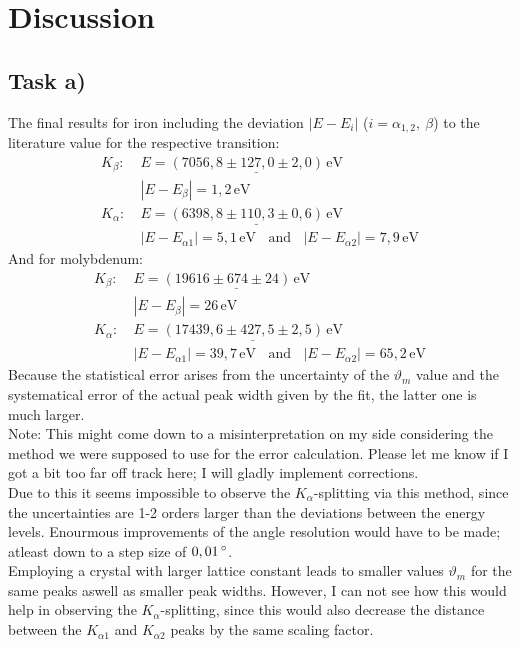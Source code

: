 \documentclass[a4paper,12pt]{article}
\begin{document}
\section{Discussion}
\subsection*{Task a)}
The final results for iron including the deviation $|E-E_{i}|$ ($i=\alpha_{1,2},\ \beta$) to the literature value for the respective transition:
\begin{align*}
K_\beta :\ &E=\underline{(7056,8\pm 127,0\pm 2,0)\,\mathrm{eV}}\\
&|E-E_{\beta}| = 1,2\,\mathrm{eV} \\
K_\alpha :\ &E=\underline{(6398,8\pm 110,3\pm 0,6)\,\mathrm{eV}}\\
&|E- E_{\alpha 1}| = 5,1\,\mathrm{eV}\ \ \ \ \mathrm{and}\ \ \ \ |E- E_{\alpha 2}| = 7,9\,\mathrm{eV}
\end{align*}
And for molybdenum:
\begin{align*}
K_\beta :\ &E=\underline{(19616\pm 674\pm 24)\,\mathrm{eV}}\\
&|E-E_{\beta}| = 26\,\mathrm{eV} \\
K_\alpha :\ &E=\underline{(17439,6\pm 427,5\pm 2,5)\,\mathrm{eV}}\\
&|E- E_{\alpha 1}| = 39,7\,\mathrm{eV}\ \ \ \ \mathrm{and}\ \ \ \ |E- E_{\alpha 2}| = 65,2\,\mathrm{eV}
\end{align*}
Because the statistical error arises from the uncertainty of the $\vartheta_m$ value and the systematical error of the actual peak width given by the fit, the latter one is much larger.\\ 
Note: This might come down to a misinterpretation on my side considering the method we were supposed to use for the error calculation. Please let me know if I got a bit too far off track here; I will gladly implement corrections.\\
Due to this it seems impossible to observe the $K_\alpha$-splitting via this method, since the uncertainties are 1-2 orders larger than the deviations between the energy levels. Enourmous improvements of the angle resolution would have to be made; atleast down to a step size of $0,01\,\degree$.\\
Employing a crystal with larger lattice constant leads to smaller values $\vartheta_m$ for the same peaks aswell as smaller peak widths. However, I can not see how this would help in observing the $K_\alpha$-splitting, since this would also decrease the distance between the $K_{\alpha1}$ and $K_{\alpha2}$ peaks by the same scaling factor.
\end{document}

